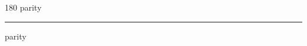 
\begin{frame}
\begin{center}
\begin{turn}{180}
{\fontsize{2.5cm}{1em}\selectfont parity}
\end{turn}
\vspace{1em}\par  
\hrule
\vspace{1em}\par  
{\fontsize{2.5cm}{1em}\selectfont parity}
\end{center}
\end{frame}
